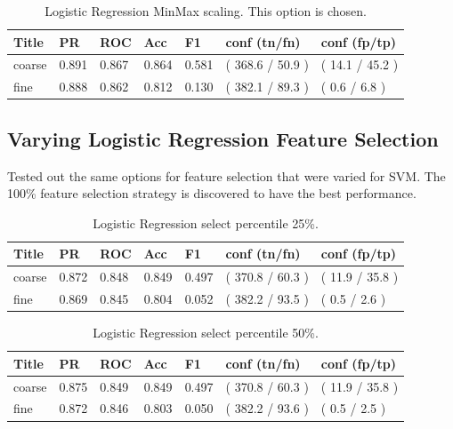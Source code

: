 \documentclass[ms]{nuthesis}
\begin{document}
\FloatBarrier
\begin{table}[H]
\centering
\caption{Logistic Regression MinMax scaling. This option is chosen.}
\label{tab:LogRegMinMax}
\begin{tabular}{|l||l||l||l||l||l||l|}\toprule
Title & PR & ROC & Acc & F1 & conf (tn/fn) & conf (fp/tp) \\ \midrule
coarse & 0.891 & 0.867 & 0.864 & 0.581 & ( 368.6 / 50.9 ) & ( 14.1 / 45.2 ) \\
fine & 0.888 & 0.862 & 0.812 & 0.130 & ( 382.1 / 89.3 ) & ( 0.6 / 6.8 ) \\ \bottomrule
\end{tabular}
\end{table}
\FloatBarrier


\subsection{Varying Logistic Regression Feature Selection}
\par Tested out the same options for feature selection that were varied for SVM.
The 100\% feature selection strategy is discovered to have the best performance.

\FloatBarrier
\begin{table}[H]
\centering
\caption{Logistic Regression select percentile 25\%.}
\label{tab:LogRegSel25}
\begin{tabular}{|l||l||l||l||l||l||l|}\toprule
Title & PR & ROC & Acc & F1 & conf (tn/fn) & conf (fp/tp) \\ \midrule
coarse & 0.872 & 0.848 & 0.849 & 0.497 & ( 370.8 / 60.3 ) & ( 11.9 / 35.8 ) \\
fine & 0.869 & 0.845 & 0.804 & 0.052 & ( 382.2 / 93.5 ) & ( 0.5 / 2.6 ) \\ \bottomrule
\end{tabular}
\end{table}
\FloatBarrier


\FloatBarrier
\begin{table}[H]
\centering
\caption{Logistic Regression select percentile 50\%.}
\label{tab:LogRegSel50}
\begin{tabular}{|l||l||l||l||l||l||l|}\toprule
Title & PR & ROC & Acc & F1 & conf (tn/fn) & conf (fp/tp) \\ \midrule
coarse & 0.875 & 0.849 & 0.849 & 0.497 & ( 370.8 / 60.3 ) & ( 11.9 / 35.8 ) \\
fine & 0.872 & 0.846 & 0.803 & 0.050 & ( 382.2 / 93.6 ) & ( 0.5 / 2.5 ) \\ \bottomrule
\end{tabular}
\end{table}
\FloatBarrier
\end{document}
